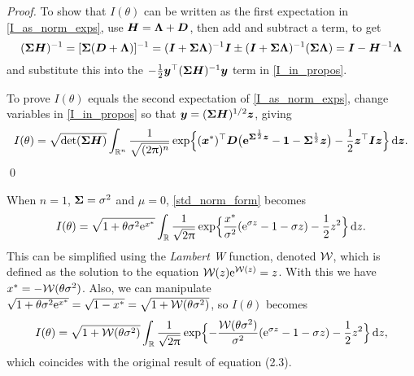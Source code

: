 \begin{proof}
To show that $I(\theta)$ can be written as the first expectation in
\eqref{I_as_norm_exps}, use $\bm{H} = \bm{\Lambda} + \bm{D}$, then add and subtract a term, to get
%
\[ (\bm{\Sigma} \bm{H})^{-1} = [\bm{\Sigma} (\bm{D} + \bm{\Lambda})]^{-1} = (\bm{I} + \bm{\Sigma} \bm{\Lambda})^{-1} \bm{I}  \pm (\bm{I} + \bm{\Sigma} \bm{\Lambda})^{-1} (\bm{\Sigma} \bm{\Lambda})  = \bm{I} - \bm{H}^{-1} \bm{\Lambda}  \]
%
and substitute this into the $-\frac12 \bm{y}^\top (\bm{\Sigma} \bm{H})^{-1} \bm{y}$ term in \eqref{I_in_propos}.

To prove $I(\theta)$ equals the second expectation of \eqref{I_as_norm_exps},
change variables in \eqref{I_in_propos} so that $\bm{y} = (\bm{\Sigma} \bm{H})^{1/2} \bm{z}$, giving
\begin{equation} \label{std_norm_form}
	I(\theta) = \sqrt{\det(\bm{\Sigma} \bm{H})}
 \int_{\mathbb{R}^n} \frac{1}{\sqrt{(2\uppi)^n}}
 \exp\Bigl\{ (\bm{x}^*)^\top \bm{D} \bigl( \text{\bf{e}}^{\bm{\Sigma}^{\frac12}\bm{z}} - \bm{1} - \bm{\Sigma}^{\frac12}\bm{z} \bigr) - \frac12 \bm{z}^\top \bm{I} \bm{z} \Bigr\}\mathop{}\!\mathrm{d} \bm{z}.
\end{equation}
\qed
\end{proof}

\begin{remark}\label{R:W} When $n=1$, $\bm{\Sigma} = \sigma^2$ and $\mu=0$,
\eqref{std_norm_form} becomes
%
\[
	I(\theta) = \sqrt{ 1 + \theta \sigma^2 \mathrm{e}^{x^*}} \int_{\mathbb{R}}
        \frac{1}{\sqrt{2\uppi}} \exp\Bigl\{ \frac{x^*}{\sigma^2} (\mathrm{e}^{\sigma z} - 1 - \sigma z ) - \frac12 z^2 \Bigr\} \mathop{}\!\mathrm{d} z.
\]
%
This can be simplified using the \emph{Lambert W} function, denoted $\mathcal{W}$,
which is defined \cite{corless1996lambertw} as the solution to the equation $\mathcal{W}(z)
\mathrm{e}^{\mathcal{W}(z)} = z$. With this we have $x^* =
-\mathcal{W}(\theta \sigma^2)$. Also, we can manipulate
$\sqrt{ 1 + \theta \sigma^2 \mathrm{e}^{x^*}}
 =  \sqrt{ 1 - x^* } = \sqrt{ 1 + \mathcal{W}(\theta \sigma^2)}$,
so $I(\theta)$ becomes
\[
	I(\theta) = \sqrt{ 1 + \mathcal{W}(\theta \sigma^2)}
 \int_{\mathbb{R}} \frac{1}{\sqrt{2\uppi}}
 \exp\Bigl\{ {-}\frac{\mathcal{W}(\theta \sigma^2)}{\sigma^2} ( \mathrm{e}^{\sigma z} - 1 - \sigma z ) - \frac12 z^2 \Bigr\} \mathop{}\!\mathrm{d} z,
\]
which coincides with the original result of \cite{asmussen2014laplace}
equation (2.3). \remQED
\end{remark}


